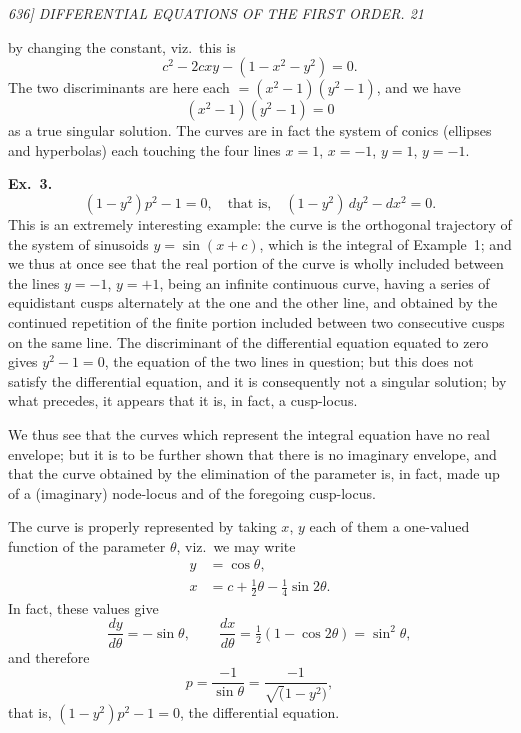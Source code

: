 \documentclass[12pt,a4paper]{article}
\begin{document}
\clearpage
\setcounter{page}{21}

\begin{center}
\textit{636] \hfill DIFFERENTIAL EQUATIONS OF THE FIRST ORDER. \hfill 21}
\end{center}

\noindent by changing the constant, viz.\ this is
\[
c^2 - 2 c x y - (1 - x^2 - y^2) = 0.
\]
The two discriminants are here each $= (x^2 - 1)(y^2 - 1)$, and we have
\[
(x^2 - 1)(y^2 - 1) = 0
\]
as a true singular solution. The curves are in fact the system of conics (ellipses and hyperbolas) each touching the four lines $x = 1$, $x = -1$, $y = 1$, $y = -1$.

\medskip\noindent\textbf{Ex.~3.}
\[
(1 - y^2) p^2 - 1 = 0, \quad \text{that is,} \quad (1 - y^2)\, d y^2 - d x^2 = 0.
\]
This is an extremely interesting example: the curve is the orthogonal trajectory of the system of sinusoids $y = \sin(x + c)$, which is the integral of Example~1; and we thus at once see that the real portion of the curve is wholly included between the lines $y = -1$, $y = +1$, being an infinite continuous curve, having a series of equidistant cusps alternately at the one and the other line, and obtained by the continued repetition of the finite portion included between two consecutive cusps on the same line. The discriminant of the differential equation equated to zero gives $y^2 - 1 = 0$, the equation of the two lines in question; but this does not satisfy the differential equation, and it is consequently not a singular solution; by what precedes, it appears that it is, in fact, a cusp-locus.

We thus see that the curves which represent the integral equation have no real envelope; but it is to be further shown that there is no imaginary envelope, and that the curve obtained by the elimination of the parameter is, in fact, made up of a (imaginary) node-locus and of the foregoing cusp-locus.

The curve is properly represented by taking $x$, $y$ each of them a one-valued function of the parameter $\theta$, viz.\ we may write
\begin{align*}
y &= \cos\theta, \\
x &= c + \tfrac{1}{2}\theta - \tfrac{1}{4}\sin 2\theta.
\end{align*}
In fact, these values give
\[
\frac{d y}{d\theta} = -\sin\theta, \qquad \frac{d x}{d\theta} = \tfrac{1}{2}(1 - \cos 2\theta) = \sin^2\theta,
\]
and therefore
\[
p = \frac{-1}{\sin\theta} = \frac{-1}{\surd(1 - y^2)},
\]
that is, $(1 - y^2) p^2 - 1 = 0$, the differential equation.
\end{document}
